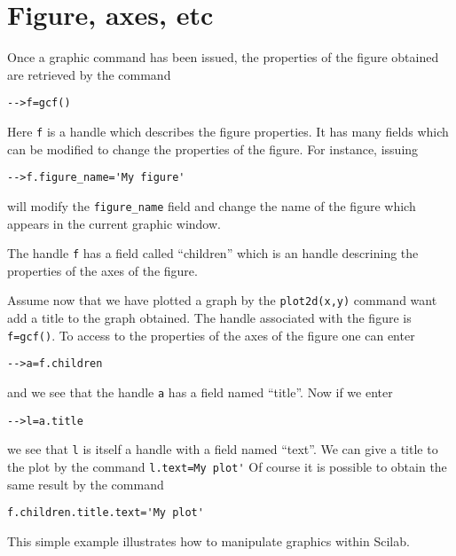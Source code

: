 \section{Figure, axes, etc}
Once a graphic command has been issued, the properties of the figure
obtained are retrieved by the command 
\begin{verbatim}
-->f=gcf()
\end{verbatim}
Here {\tt f} is a handle which describes the figure properties.
It has many fields which can be modified to change the properties
of the figure.
For instance, issuing
\begin{verbatim}
-->f.figure_name='My figure'
\end{verbatim}
will modify the \verb!figure_name! field and change the name of the 
figure which appears in the current graphic window.

The handle {\tt f} has a field called ``children'' which is an handle
descrining the properties of the axes of the figure.

Assume now that we have plotted a graph by the 
{\tt plot2d(x,y)} command want add a title to the graph obtained.
The handle associated with the figure is \verb!f=gcf()!.
To access to the properties of the axes of the figure one can enter
\begin{verbatim}
-->a=f.children
\end{verbatim}
and we see that the handle {\tt a} has a field named ``title''.
Now if we enter 
\begin{verbatim}
-->l=a.title
\end{verbatim}
we see that {\tt l} is itself a handle with a field named ``text''.
We can give a title to the plot by the command \verb!l.text=My plot'!
Of course it is possible to obtain the same result by
the command
\begin{verbatim}
f.children.title.text='My plot'
\end{verbatim}
This simple example illustrates how to manipulate graphics within Scilab.

